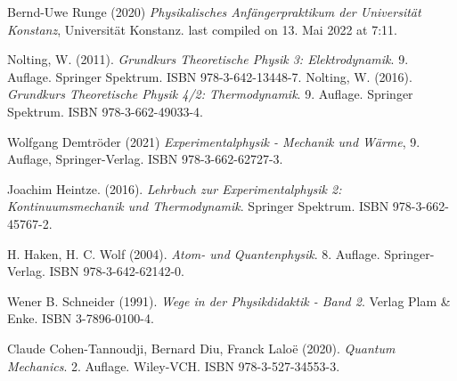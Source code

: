 \documentclass[../main.tex]{subfiles}
\begin{document}
	\begin{thebibliography}{99}
		 Bernd-Uwe Runge (2020) \emph{Physikalisches Anfängerpraktikum der Universität Konstanz}, Universität Konstanz. last compiled on 13. Mai 2022 at 7:11. 

		 Nolting, W. (2011). \emph{Grundkurs Theoretische Physik 3: Elektrodynamik}. 9. Auflage. Springer Spektrum. ISBN 978-3-642-13448-7.
		 Nolting, W. (2016). \emph{Grundkurs Theoretische Physik 4/2: Thermodynamik}. 9. Auflage. Springer Spektrum. ISBN 978-3-662-49033-4.

		 Wolfgang Demtröder (2021) \emph{Experimentalphysik - Mechanik und Wärme}, 9. Auflage, Springer-Verlag. ISBN 978-3-662-62727-3.
		
		 Joachim Heintze. (2016). \emph{Lehrbuch zur Experimentalphysik 2: Kontinuumsmechanik und Thermodynamik}. Springer Spektrum. ISBN 978-3-662-45767-2.


		 H. Haken, H. C. Wolf (2004). \emph{Atom- und Quantenphysik}. 8. Auflage. Springer-Verlag. ISBN 978-3-642-62142-0.

		 Wener B. Schneider (1991). \emph{Wege in der Physikdidaktik - Band 2}. Verlag Plam \& Enke. ISBN 3-7896-0100-4.

		 Claude Cohen-Tannoudji, Bernard Diu, Franck Laloë (2020). \emph{Quantum Mechanics}. 2. Auflage. Wiley-VCH. ISBN 978-3-527-34553-3.


\end{thebibliography}
\end{document}

